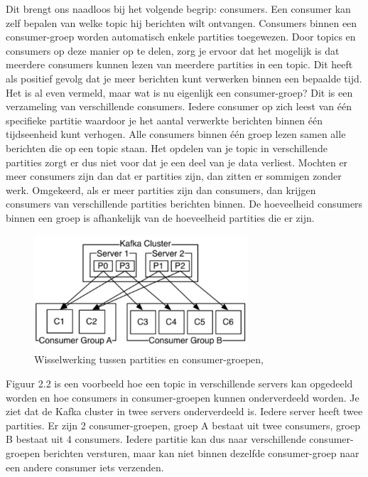Dit brengt ons naadloos bij het volgende begrip: consumers. Een consumer kan zelf bepalen van welke topic hij berichten wilt ontvangen. Consumers binnen een consumer-groep worden automatisch enkele partities toegewezen. Door topics en consumers op deze manier op te delen, zorg je ervoor dat het mogelijk is dat meerdere consumers kunnen lezen van meerdere partities in een topic. Dit heeft als positief gevolg dat je meer berichten kunt verwerken binnen een bepaalde tijd. Het is al even vermeld, maar wat is nu eigenlijk een consumer-groep? Dit is een verzameling van verschillende consumers. Iedere consumer op zich leest van één specifieke partitie waardoor je het aantal verwerkte berichten binnen één tijdseenheid kunt verhogen. Alle consumers binnen één groep lezen samen alle berichten die op een topic staan. Het opdelen van je topic in verschillende partities zorgt er dus niet voor dat je een deel van je data verliest. Mochten er meer consumers zijn dan dat er partities zijn, dan zitten er sommigen zonder werk. Omgekeerd, als er meer partities zijn dan consumers, dan krijgen consumers van verschillende partities berichten binnen. De hoeveelheid consumers binnen een groep is afhankelijk van de hoeveelheid partities die er zijn.

 \begin{figure}[h!]
    \centering
    \includegraphics[width=80mm]{../kafkaConsumers.png}
    \caption{Wisselwerking tussen partities en consumer-groepen, \autocite{Sookocheff2015}}
    
\end{figure}

Figuur 2.2 is een voorbeeld hoe een topic in verschillende servers kan opgedeeld worden en hoe consumers in consumer-groepen kunnen onderverdeeld worden. Je ziet dat de Kafka cluster in twee servers onderverdeeld is. Iedere server heeft twee partities. Er zijn 2 consumer-groepen, groep A bestaat uit twee consumers, groep B bestaat uit 4 consumers. Iedere partitie kan dus naar verschillende consumer-groepen berichten versturen, maar kan niet binnen dezelfde consumer-groep naar een andere consumer iets verzenden. 

